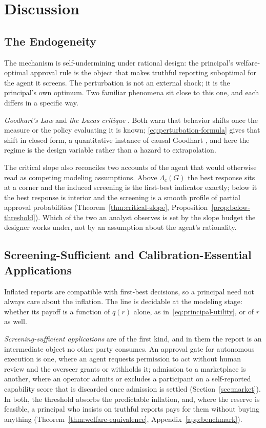 \documentclass[acmsmall,nonacm,screen]{acmart}
\theoremstyle{acmplain}%
\theoremstyle{acmdefinition}%
\numberwithin{equation}{section}
\begin{document}
\section{Discussion}\label{sec:discussion}

\subsection{The Endogeneity}

The mechanism is self-undermining under rational design: the principal's welfare-optimal approval rule is the object that makes truthful reporting suboptimal for the agent it screens. The perturbation is not an external shock; it is the principal's own optimum. Two familiar phenomena sit close to this one, and each differs in a specific way.

\emph{Goodhart's Law} \citep{goodhart1984problems} and \emph{the Lucas critique} \citep{lucas1976econometric}. Both warn that behavior shifts once the measure or the policy evaluating it is known; \eqref{eq:perturbation-formula} gives that shift in closed form, a quantitative instance of causal Goodhart \citep{manheim2018categorizing}, and here the regime is the design variable rather than a hazard to extrapolation.

The critical slope also reconciles two accounts of the agent that would otherwise read as competing modeling assumptions. Above $\Lambda_c(G)$ the best response sits at a corner and the induced screening is the first-best indicator exactly; below it the best response is interior and the screening is a smooth profile of partial approval probabilities (Theorem~\ref{thm:critical-slope}, Proposition~\ref{prop:below-threshold}). Which of the two an analyst observes is set by the slope budget the designer works under, not by an assumption about the agent's rationality.

\subsection{Screening-Sufficient and Calibration-Essential Applications}

Inflated reports are compatible with first-best decisions, so a principal need not always care about the inflation. The line is decidable at the modeling stage: whether its payoff is a function of $q(r)$ alone, as in~\eqref{eq:principal-utility}, or of $r$ as well.

\emph{Screening-sufficient applications} are of the first kind, and in them the report is an intermediate object no other party consumes. An approval gate for autonomous execution is one, where an agent requests permission to act without human review and the overseer grants or withholds it; admission to a marketplace is another, where an operator admits or excludes a participant on a self-reported capability score that is discarded once admission is settled (Section~\ref{sec:market}). In both, the threshold absorbs the predictable inflation, and, where the reserve is feasible, a principal who insists on truthful reports pays for them without buying anything (Theorem~\ref{thm:welfare-equivalence}, Appendix~\ref{app:benchmark}).
\end{document}

